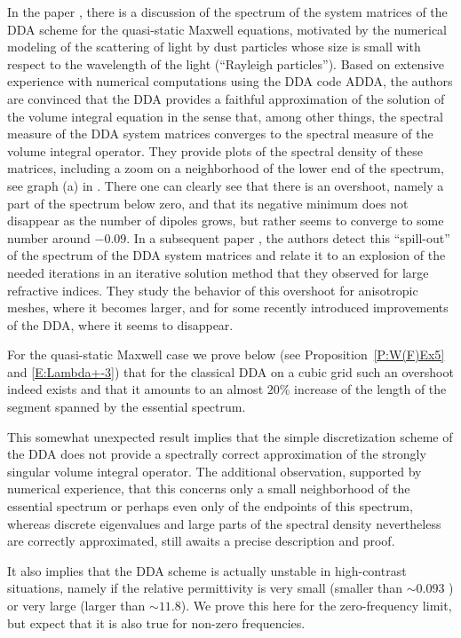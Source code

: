\documentclass[12pt]{amsart}
\theoremstyle{definition}
\theoremstyle{remark}
\numberwithin{equation}{section}
\begin{document}
In the paper \cite{YurkinMinHoekstra2010}, there is a discussion of the spectrum of the system matrices of the DDA scheme for the quasi-static Maxwell equations, motivated by the numerical modeling of the scattering of light by dust particles whose size is small with respect to the wavelength of the light (``Rayleigh particles''). Based on extensive experience with numerical computations using the DDA code ADDA, the authors are convinced that the DDA provides a faithful approximation of the solution of the volume integral equation in the sense that, among other things, the spectral measure of the DDA system matrices converges to the spectral measure of the volume integral operator. They provide plots of the spectral density of these matrices, including a zoom on a neighborhood of the lower end of the spectrum, see graph (a) in \cite[FIG. 8]{YurkinMinHoekstra2010}. There one can clearly see that there is an overshoot, namely a part of the spectrum below zero, and that its negative minimum does not disappear as the number of dipoles grows, but rather seems to converge to some number around $-0.09$.
In a subsequent paper \cite{Smunev_JQSRT_15}, the authors detect this ``spill-out'' of the spectrum of the DDA system matrices and relate it to an explosion of the needed iterations in an iterative solution method that they observed for large refractive indices. They study the behavior of this overshoot for anisotropic meshes, where it becomes larger, and for some recently introduced improvements of the DDA, where it seems to disappear.


For the quasi-static Maxwell case we prove below (see Proposition~\ref{P:W(F)Ex5} and \eqref{E:Lambda+-3}) that for the classical DDA on a cubic grid such an overshoot indeed exists and that it amounts to an almost $20\%$ increase of the length of the segment spanned by the essential spectrum. 

This somewhat unexpected result implies that the simple discretization scheme of the DDA does not provide a spectrally correct approximation of the strongly singular volume integral operator. The additional observation, supported by numerical experience, that this concerns only a small neighborhood of the essential spectrum or perhaps even only of the endpoints of this spectrum, whereas discrete eigenvalues and large parts of the spectral density nevertheless are correctly approximated, still awaits a precise description and proof.

It also implies that the DDA scheme is actually unstable in high-contrast situations, namely if the relative permittivity is very small (smaller than $\sim 0.093$ ) or very large (larger than $\sim 11.8$). We prove this here for the zero-frequency limit, but expect that it is also true for non-zero frequencies. 
\end{document}
